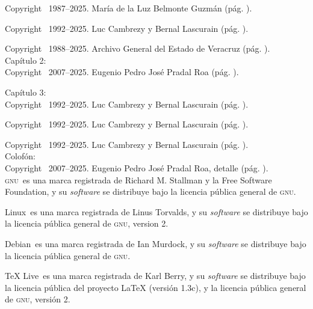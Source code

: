 \documentclass[14pt,twoside,final]{extbook} %
\begin{document}
\noindent Copyright \textcopyright\ 1987--2025. María de la Luz Belmonte Guzmán (pág. \pageref{fig:veracruz-1857}).

\noindent Copyright \textcopyright\ 1992--2025. Luc Cambrezy y Bernal Lascurain (pág. \pageref{fig:jalacingo-principios-xx}).

\noindent Copyright \textcopyright\ 1988--2025. Archivo General del Estado de Veracruz (pág. \pageref{fig:progreso-industrial}). \\

\noindent Capítulo 2: \\

\noindent Copyright \textcopyright\ 2007--2025. Eugenio Pedro José Pradal Roa (pág. \pageref{fig:jalacingo-photo}).

\noindent Capítulo 3: \\

\noindent Copyright \textcopyright\ 1992--2025. Luc Cambrezy y Bernal Lascurain (pág. \pageref{fig:hda-limon}).

\noindent Copyright \textcopyright\ 1992--2025. Luc Cambrezy y Bernal Lascurain (pág. \pageref{fig:hda-cuatotolapam}).

\noindent Copyright \textcopyright\ 1992--2025. Luc Cambrezy y Bernal Lascurain (pág. \pageref{fig:hda-tenextepec}). \\

\noindent Colofón: \\

\noindent Copyright \textcopyright\ 2007--2025. Eugenio Pedro José Pradal Roa, detalle (pág. \pageref{fig:vineta}). \\

\noindent\textsc{gnu}\texttrademark\ es una marca registrada de Richard M. Stallman y la Free Software Foundation, y su \emph{software} se distribuye bajo la licencia pública general de \textsc{gnu}.

Linux\texttrademark\ es una marca registrada de Linus Torvalds, y su \emph{software} se distribuye bajo la licencia pública general de \textsc{gnu}, version 2.

Debian\texttrademark\ es una marca registrada de Ian Murdock,\textsuperscript{\textdagger} y su \emph{software} se distribuye bajo la licencia pública general de \textsc{gnu}.

TeX Live\texttrademark\ es una marca registrada de Karl Berry, y su \emph{software} se distribuye bajo la licencia pública del proyecto LaTeX (versión 1.3c), y la licencia pública general de \textsc{gnu}, versión 2.
\end{document}
